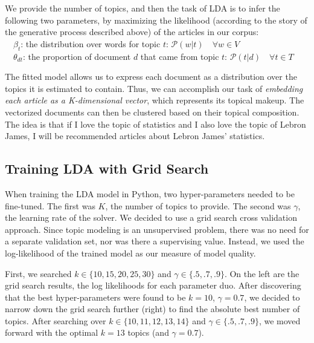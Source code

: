 \documentclass[11pt]{article}
\begin{document}
We provide the number of topics, and then the task of LDA is to infer the following two parameters, by maximizing the likelihood (according to the story of the generative process described above) of the articles in our corpus: \\
$\text{} \quad \beta_t$: the distribution over words for topic $t$: $\mathcal{P}(w | t) \quad \forall w \in V$ \\
$\text{} \quad \theta_{dt}$: the proportion of document $d$ that came from topic $t$: $\mathcal{P}(t | d) \quad \forall t \in T$ 

The fitted model allows us to express each document as a distribution over the topics it is estimated to contain. Thus, we can accomplish our task of \textit{embedding each article as a K-dimensional vector}, which represents its topical makeup.  The vectorized documents can then be clustered based on their topical composition. The idea is that if I love the topic of statistics and I also love the topic of Lebron James, I will be recommended articles about Lebron James' statistics.  

\subsection{Training LDA with Grid Search}
When training the LDA model in Python, two hyper-parameters needed to be fine-tuned. The first was $K$, the number of topics to provide.  The second was $\gamma$, the learning rate of the solver. We decided to use a grid search cross validation approach.  Since topic modeling is an unsupervised problem, there was no need for a separate validation set, nor was there a supervising value.  Instead, we used the log-likelihood of the trained model as our measure of model quality. 

First, we searched $k \in \{10, 15, 20, 25, 30\}$ and $\gamma \in \{.5, .7, .9\}$. On the left are the grid search results, the log likelihoods for each parameter duo. After discovering that the best hyper-parameters were found to be $k=10$, $\gamma = 0.7$, we decided to narrow down the grid search further (right) to find the absolute best number of topics.  After searching over $k \in \{10, 11, 12, 13, 14\}$ and $\gamma \in \{.5, .7, .9\}$, we moved forward with the optimal $k=13$ topics (and $\gamma = 0.7$). \\
\end{document}

